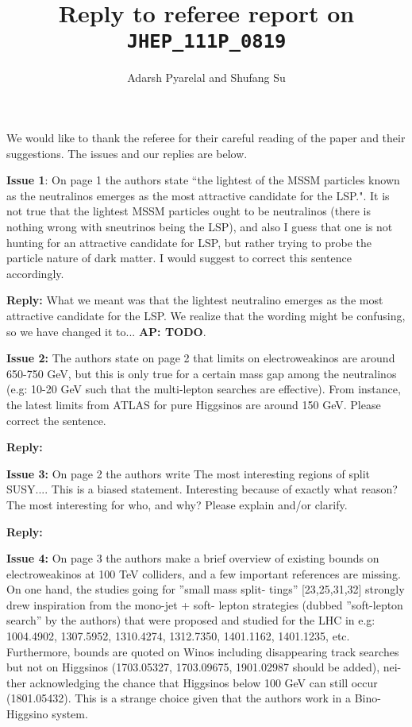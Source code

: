 \documentclass[12pt]{article}
\title{Reply to referee report on \texttt{JHEP\_111P\_0819}}
\author{Adarsh Pyarelal and Shufang Su}
\newcommand{\Adarsh}[1]{{\bf\color{RoyalBlue} AP: #1}}
\begin{document}
\maketitle

We would like to thank the referee for their careful reading of the paper and their 
suggestions. The issues and our replies are below.

\noindent \textbf{Issue 1}: On page 1 the authors state ``the lightest of the
MSSM particles known as the neutralinos emerges as the most attractive
candidate for the LSP.". It is not true that the lightest MSSM particles ought
to be neutralinos (there is nothing wrong with sneutrinos being the LSP), and
also I guess that one is not hunting for an attractive candidate for LSP, but
rather trying to probe the particle nature of dark matter. I would suggest to
correct this sentence accordingly.

\noindent\textbf{Reply:} What we meant was that the lightest neutralino
emerges as the most attractive candidate for the LSP. We realize that the
wording might be confusing, so we have changed it to...\Adarsh{TODO}.

\bigskip

\noindent\textbf{Issue 2:} The authors state on page 2 that limits on
electroweakinos are around 650-750 GeV, but this is only true for a certain
mass gap among the neutralinos (e.g: 10-20 GeV such that the multi-lepton
searches are effective). From instance, the latest limits from ATLAS for pure
Higgsinos are around 150 GeV. Please correct the sentence.

\noindent\textbf{Reply:} 

\bigskip

\noindent\textbf{Issue 3:} On page 2 the authors write The most interesting
regions of split SUSY....  This is a biased statement. Interesting because of
exactly what reason? The most interesting for who, and why? Please explain
and/or clarify.

\noindent\textbf{Reply:} 

\bigskip

\noindent\textbf{Issue 4:} On page 3 the authors make a brief overview of
existing bounds on electroweakinos at 100 TeV colliders, and a few important
references are missing. On one hand, the studies going for ”small mass split-
tings” [23,25,31,32] strongly drew inspiration from the mono-jet + soft- lepton
strategies (dubbed ”soft-lepton search” by the authors) that were proposed and
studied for the LHC in e.g: 1004.4902, 1307.5952, 1310.4274, 1312.7350,
1401.1162, 1401.1235, etc. Furthermore, bounds are quoted on Winos including
disappearing track searches but not on Higgsinos (1703.05327, 1703.09675,
1901.02987 should be added), nei- ther acknowledging the chance that Higgsinos
below 100 GeV can still occur (1801.05432). This is a strange choice given that
the authors work in a Bino-Higgsino system.
\end{document}
